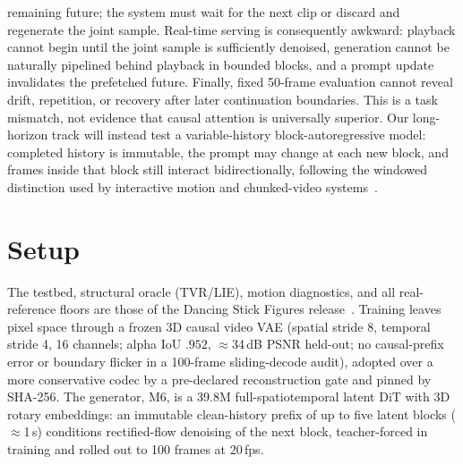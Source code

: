 \documentclass[10pt,twocolumn]{article}
\begin{document}
remaining future; the system must wait for the next clip or discard and regenerate the joint sample. Real-time serving
is consequently awkward: playback cannot begin until the joint sample is sufficiently denoised, generation cannot be
naturally pipelined behind playback in bounded blocks, and a prompt update invalidates the prefetched future. Finally,
fixed 50-frame evaluation cannot reveal drift, repetition, or recovery after later continuation boundaries. This is a
task mismatch, not evidence that causal attention is universally superior. Our long-horizon track will instead test a
variable-history block-autoregressive model: completed history is immutable, the prompt may change at each new block,
and frames inside that block still interact bidirectionally, following the windowed distinction used by interactive
motion and chunked-video systems~\cite{zhao2026ardy,magi2025,yin2026evoke}.

\section{Setup}
The testbed, structural oracle (TVR/LIE), motion diagnostics, and all real-reference floors are those of the Dancing
Stick Figures release~\cite{cho2026dsf}. Training leaves pixel space through a frozen 3D causal video VAE (spatial
stride 8, temporal stride 4, 16 channels; alpha IoU $.952$, $\approx$34\,dB PSNR held-out; no causal-prefix error or
boundary flicker in a 100-frame sliding-decode audit), adopted over a more conservative codec by a pre-declared
reconstruction gate and pinned by SHA-256. The generator, M6, is a 39.8M full-spatiotemporal latent DiT with 3D
rotary embeddings: an immutable clean-history prefix of up to five latent blocks ($\approx$1\,s) conditions
rectified-flow denoising of the next block, teacher-forced in training and rolled out to 100 frames at 20\,fps.
\end{document}
